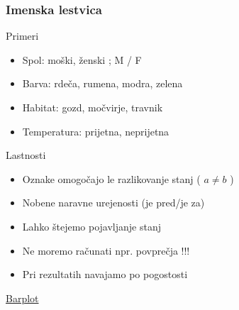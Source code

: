 \begin{frame}[fragile]
\frametitle{Imenska lestvica}
\begin{block}{Primeri}

\begin{itemize}
  \item Spol: moški, ženski ; M / F
  \item Barva: rdeča, rumena, modra, zelena
  \item Habitat: gozd, močvirje, travnik
  \item Temperatura: prijetna, neprijetna
\end{itemize}
\end{block}
\begin{block}{Lastnosti}

\begin{itemize}
  \item Oznake omogočajo le razlikovanje stanj ( $a \neq b$ )
  \item Nobene naravne urejenosti (je pred/je za)
  \item Lahko štejemo pojavljanje stanj
  \item Ne moremo računati npr. povprečja !!!
  \item Pri rezultatih navajamo po pogostosti
  \end{itemize}
\end{block}
\href{http://ablejec.nib.si/pub/HowTo/HowTo-barplot.pdf}{Barplot}
\end{frame}

